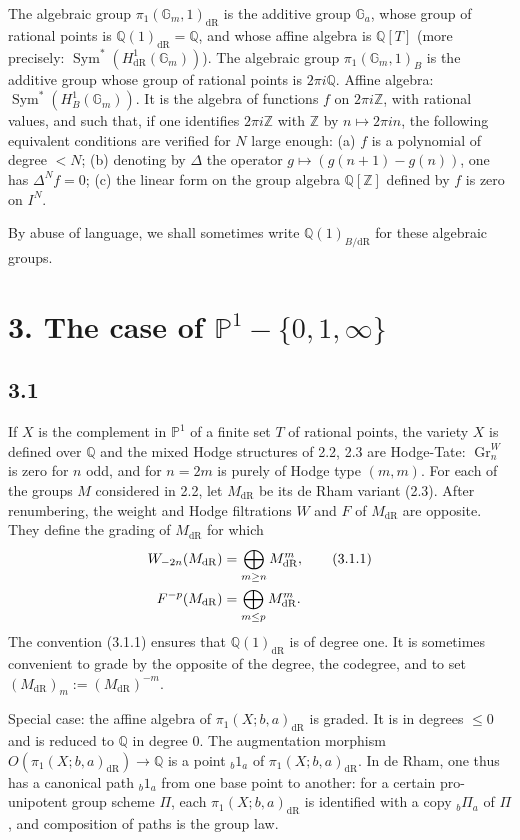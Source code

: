 \documentclass[10pt]{article}
\newcommand{\Q}{\mathbb Q}
\newcommand{\Z}{\mathbb Z}
\newcommand{\Gm}{\mathbb G_m}
\newcommand{\Ga}{\mathbb G_a}
\newcommand{\PP}{\mathbb P}
\newcommand{\Sym}{\operatorname{Sym}}
\newcommand{\Gr}{\operatorname{Gr}}
\newcommand{\dR}{\mathrm{dR}}
\begin{document}
The algebraic group $\pi_1(\Gm,1)_{\dR}$ is the additive group $\Ga$, whose group of rational points is $\Q(1)_{\dR}=\Q$, and whose affine algebra is $\Q[T]$ (more precisely: $\Sym^*(H^1_{\dR}(\Gm))$).
The algebraic group $\pi_1(\Gm,1)_B$ is the additive group whose group of rational points is $2\pi i\Q$.
Affine algebra: $\Sym^*(H^1_B(\Gm))$.
It is the algebra of functions $f$ on $2\pi i\Z$, with rational values, and such that, if one identifies $2\pi i\Z$ with $\Z$ by $n\mapsto2\pi in$, the following equivalent conditions are verified for $N$ large enough: (a) $f$ is a polynomial of degree $<N$; (b) denoting by $\Delta$ the operator $g\mapsto(g(n+1)-g(n))$, one has $\Delta^Nf=0$; (c) the linear form on the group algebra $\Q[\Z]$ defined by $f$ is zero on $I^N$.

By abuse of language, we shall sometimes write $\Q(1)_{B/\dR}$ for these algebraic groups.

\section*{3. The case of $\PP^1-\{0,1,\infty\}$}

\subsection*{3.1}
If $X$ is the complement in $\PP^1$ of a finite set $T$ of rational points, the variety $X$ is defined over $\Q$ and the mixed Hodge structures of 2.2, 2.3 are Hodge-Tate: $\Gr^W_n$ is zero for $n$ odd, and for $n=2m$ is purely of Hodge type $(m,m)$.
For each of the groups $M$ considered in 2.2, let $M_{\dR}$ be its de Rham variant (2.3).
After renumbering, the weight and Hodge filtrations $W$ and $F$ of $M_{\dR}$ are opposite.
They define the grading of $M_{\dR}$ for which
\begin{align}
 W_{-2n}(M_{\dR})&=\bigoplus_{m\geq n}M^m_{\dR},
\tag{3.1.1}\\
 F^{-p}(M_{\dR})&=\bigoplus_{m\leq p}M^m_{\dR}.
\notag
\end{align}
The convention (3.1.1) ensures that $\Q(1)_{\dR}$ is of degree one.
It is sometimes convenient to grade by the opposite of the degree, the codegree, and to set $(M_{\dR})_m:=(M_{\dR})^{-m}$.

Special case: the affine algebra of $\pi_1(X;b,a)_{\dR}$ is graded.
It is in degrees $\leq0$ and is reduced to $\Q$ in degree $0$.
The augmentation morphism $O(\pi_1(X;b,a)_{\dR})\to\Q$ is a point ${}_b1_a$ of $\pi_1(X;b,a)_{\dR}$.
In de Rham, one thus has a canonical path ${}_b1_a$ from one base point to another: for a certain pro-unipotent group scheme $\Pi$, each $\pi_1(X;b,a)_{\dR}$ is identified with a copy ${}_b\Pi_a$ of $\Pi$, and composition of paths is the group law.
\end{document}
